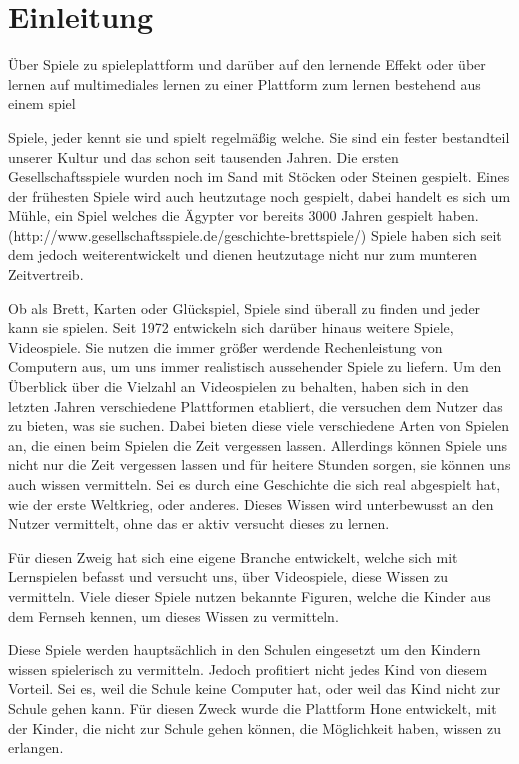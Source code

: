 \chapter{Einleitung}

Über Spiele zu spieleplattform und darüber auf den lernende Effekt oder über lernen auf multimediales lernen zu einer Plattform zum lernen bestehend aus einem spiel

Spiele, jeder kennt sie und spielt regelmäßig welche. Sie sind ein fester bestandteil unserer Kultur und das schon seit tausenden Jahren. Die ersten Gesellschaftsspiele wurden noch im Sand mit Stöcken oder Steinen gespielt.  Eines der frühesten Spiele wird auch heutzutage noch gespielt, dabei handelt es sich um Mühle, ein Spiel welches die Ägypter vor bereits 3000 Jahren gespielt haben.(http://www.gesellschaftsspiele.de/geschichte-brettspiele/) Spiele haben sich seit dem jedoch weiterentwickelt und dienen heutzutage nicht nur zum munteren Zeitvertreib. 

Ob als Brett, Karten oder Glückspiel, Spiele sind überall zu finden und jeder kann sie spielen. Seit 1972 entwickeln sich darüber hinaus weitere Spiele, Videospiele. Sie nutzen die immer größer werdende Rechenleistung von Computern aus, um uns immer realistisch aussehender Spiele zu liefern. 
Um den Überblick über die Vielzahl an Videospielen zu behalten, haben sich in den letzten Jahren verschiedene Plattformen etabliert, die versuchen dem Nutzer das zu bieten, was sie suchen. Dabei bieten diese viele verschiedene Arten von Spielen an, die einen beim Spielen die Zeit vergessen lassen.
Allerdings können Spiele uns nicht nur die Zeit vergessen lassen und für heitere Stunden sorgen, sie können uns auch wissen vermitteln. Sei es durch eine Geschichte die sich real abgespielt hat, wie der erste Weltkrieg, oder anderes. Dieses Wissen wird unterbewusst an den Nutzer vermittelt, ohne das er aktiv versucht dieses zu lernen.

Für diesen Zweig hat sich eine eigene Branche entwickelt, welche sich mit Lernspielen befasst und versucht uns, über Videospiele, diese Wissen zu vermitteln. Viele dieser Spiele nutzen bekannte Figuren, welche die Kinder aus dem Fernseh kennen, um dieses Wissen zu vermitteln.

Diese Spiele werden hauptsächlich in den Schulen eingesetzt um den Kindern wissen spielerisch zu vermitteln. Jedoch profitiert nicht jedes Kind von diesem Vorteil. Sei es, weil die Schule keine Computer hat, oder weil das Kind nicht zur Schule gehen kann. Für diesen Zweck wurde die Plattform Hone entwickelt, mit der Kinder, die nicht zur Schule gehen können, die Möglichkeit haben, wissen zu erlangen. 

